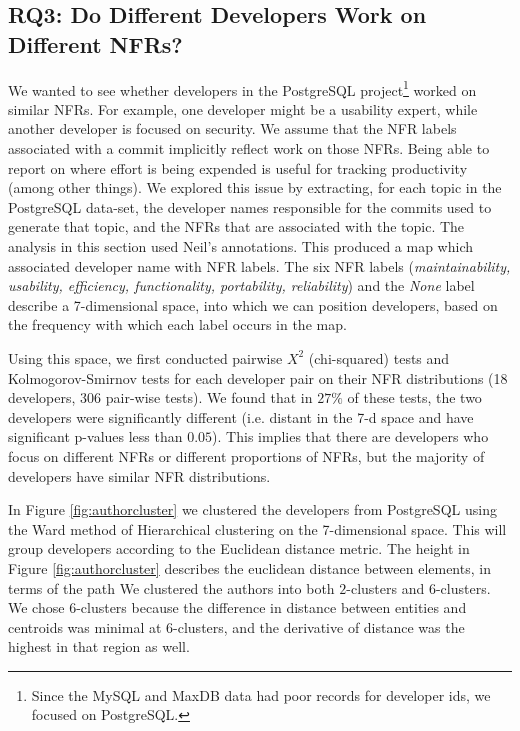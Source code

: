 \documentclass[smallextended]{svjour3}       %
\begin{document}

\subsection{RQ3: Do Different Developers Work on Different NFRs?}

\label{sec:developers}


We wanted to see whether developers in the PostgreSQL project\footnote{Since the MySQL and MaxDB data had poor records for developer ids, we focused on PostgreSQL.} worked on similar NFRs. For example, one developer might be a usability expert, while
another developer is focused on security. We assume that the NFR labels associated with a commit implicitly reflect work on those NFRs. Being able to report on where effort is being expended is useful for tracking productivity (among other things).
We explored this issue by extracting, for each topic in the PostgreSQL data-set, the developer names responsible for the commits used to generate that topic, and 
the NFRs that are associated with the topic. 
The analysis in this section used Neil's annotations.
This produced a map which associated developer name with NFR labels. The six NFR labels (\emph{maintainability, usability, efficiency, functionality, portability, reliability}) and the \emph{None} label describe a 7-dimensional space, into which we can position developers, based on the frequency with which each label occurs in the map.

Using this space, we first conducted pairwise $X^2$ (chi-squared)
tests and Kolmogorov-Smirnov tests for each developer 
 pair on their
NFR distributions
(18 developers, 306 pair-wise tests).
We
found that in $27\%$ of these tests, the two developers were significantly
different (i.e. distant in the 7-d space and have significant p-values less than $0.05$). This implies
that there are developers who focus on different NFRs or different
proportions of NFRs, but the majority of developers have similar NFR distributions.

In Figure \ref{fig:authorcluster} we clustered the developers from
PostgreSQL using the
Ward method of Hierarchical clustering on the 7-dimensional space.  
This will group developers according to the Euclidean distance metric.
The height in Figure \ref{fig:authorcluster} describes the euclidean
distance between elements, in terms of the path 
We clustered the authors into both $2$-clusters
and $6$-clusters. We chose $6$-clusters because the difference in distance
between entities and centroids was minimal at $6$-clusters, and the
derivative of distance was the highest in that region as well.
\end{document}
